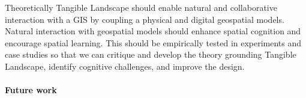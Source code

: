 \documentclass{article}
\begin{document}
Theoretically Tangible Landscape should enable natural and collaborative interaction with a GIS by coupling a physical and digital geospatial models.
Natural interaction with geospatial models should enhance spatial cognition and encourage spatial learning. 
This should be empirically tested in experiments and case studies
so that we can critique and develop the theory grounding Tangible Landscape, 
identify cognitive challenges, and 
improve the design.  


















\paragraph{Future work}


























 
\end{document}
